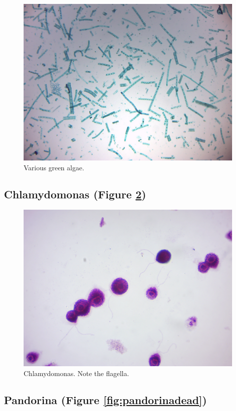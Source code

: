 \begin{figure}

{\centering \includegraphics[width=0.7\linewidth]{./figures/protists/Mixed_green_algae} 

}

\caption{Various green algae.}\label{fig:mixedalgae}
\end{figure}

\subsection{Chlamydomonas (Figure
\ref{fig:chlamydomonas})}\label{chlamydomonas-figure-reffigchlamydomonas}

\begin{figure}

{\centering \includegraphics[width=0.7\linewidth]{./figures/protists/chlamydomonas} 

}

\caption{Chlamydomonas. Note the flagella.}\label{fig:chlamydomonas}
\end{figure}

\subsection{Pandorina (Figure
\ref{fig:pandorinadead})}\label{pandorina-figure-reffigpandorinadead}

